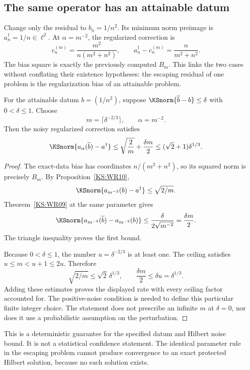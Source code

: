 \subsection{The same operator has an attainable datum}
Change only the residual to $b_n=1/n^2$. Its minimum norm preimage is $a^\dagger_n=1/n\in\ell^2$. At $\alpha=m^{-2}$, the regularized correction is
\[
 c^{(m)}_n=\frac{m^2}{n(m^2+n^2)},\qquad
 a^\dagger_n-c^{(m)}_n=\frac{n}{m^2+n^2}.
\]
The bias square is exactly the previously computed $B_m$. This links the two cases without conflating their existence hypotheses: the escaping residual of one problem is the regularization bias of an attainable problem.

\begin{KScorollary}\label{KS:WR12}
For the attainable datum $b=(1/n^2)$, suppose $\KSnorm{\widetilde b-b}\le\delta$ with $0<\delta\le1$. Choose
\[
 m=\lceil\delta^{-2/3}\rceil,\qquad\alpha=m^{-2}.
\]
Then the noisy regularized correction satisfies
\[
 \KSnorm{a_\alpha(\widetilde b)-a^\dagger}
 \le\sqrt{\frac2m}+\frac{\delta m}{2}
 \le(\sqrt2+1)\delta^{1/3}.
\]
\end{KScorollary}
\begin{proof}
The exact-data bias has coordinates $n/(m^2+n^2)$, so its squared norm is precisely $B_m$. By Proposition~\ref{KS:WR10},
\[
 \KSnorm{a_{m^{-2}}(b)-a^\dagger}\le\sqrt{2/m}.
\]
Theorem~\ref{KS:WR09} at the same parameter gives
\[
 \KSnorm{a_{m^{-2}}(\widetilde b)-a_{m^{-2}}(b)}
 \le\frac{\delta}{2\sqrt{m^{-2}}}=\frac{\delta m}{2}.
\]
The triangle inequality proves the first bound.

Because $0<\delta\le1$, the number $u=\delta^{-2/3}$ is at least one. The ceiling satisfies $u\le m<u+1\le2u$. Therefore
\[
 \sqrt{2/m}\le\sqrt2\,\delta^{1/3},
 \qquad \frac{\delta m}{2}\le\delta u=\delta^{1/3}.
\]
Adding these estimates proves the displayed rate with every ceiling factor accounted for. The positive-noise condition is needed to define this particular finite integer choice. The statement does not prescribe an infinite $m$ at $\delta=0$, nor does it use a probabilistic assumption on the perturbation.
\end{proof}

This is a deterministic guarantee for the specified datum and Hilbert noise bound. It is not a statistical confidence statement. The identical parameter rule in the escaping problem cannot produce convergence to an exact protected Hilbert solution, because no such solution exists.

